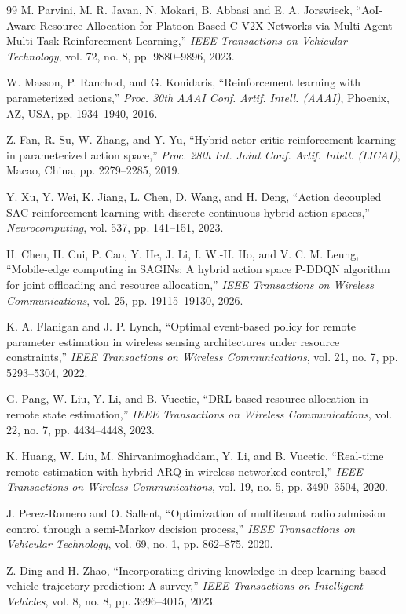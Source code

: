\documentclass[journal]{IEEEtran}
\begin{document}
\begin{thebibliography}{99}
 M. Parvini, M. R. Javan, N. Mokari, B. Abbasi and E. A. Jorswieck, ``AoI-Aware Resource Allocation for Platoon-Based C-V2X Networks via Multi-Agent Multi-Task Reinforcement Learning,'' \emph{IEEE Transactions on Vehicular Technology}, vol. 72, no. 8, pp. 9880--9896, 2023.

 W. Masson, P. Ranchod, and G. Konidaris, ``Reinforcement learning with parameterized actions,'' \emph{Proc. 30th AAAI Conf. Artif. Intell. (AAAI)}, Phoenix, AZ, USA, pp. 1934--1940, 2016.

 Z. Fan, R. Su, W. Zhang, and Y. Yu, ``Hybrid actor-critic reinforcement learning in parameterized action space,'' \emph{Proc. 28th Int. Joint Conf. Artif. Intell. (IJCAI)}, Macao, China, pp. 2279--2285, 2019.

 Y. Xu, Y. Wei, K. Jiang, L. Chen, D. Wang, and H. Deng, ``Action decoupled SAC reinforcement learning with discrete-continuous hybrid action spaces,'' \emph{Neurocomputing}, vol. 537, pp. 141--151, 2023.

 H. Chen, H. Cui, P. Cao, Y. He, J. Li, I. W.-H. Ho, and V. C. M. Leung, ``Mobile-edge computing in SAGINs: A hybrid action space P-DDQN algorithm for joint offloading and resource allocation,'' \emph{IEEE Transactions on Wireless Communications}, vol. 25, pp. 19115--19130, 2026.

 K. A. Flanigan and J. P. Lynch, ``Optimal event-based policy for remote parameter estimation in wireless sensing architectures under resource constraints,'' \emph{IEEE Transactions on Wireless Communications}, vol. 21, no. 7, pp. 5293--5304, 2022.

 G. Pang, W. Liu, Y. Li, and B. Vucetic, ``DRL-based resource allocation in remote state estimation,'' \emph{IEEE Transactions on Wireless Communications}, vol. 22, no. 7, pp. 4434--4448, 2023.

 K. Huang, W. Liu, M. Shirvanimoghaddam, Y. Li, and B. Vucetic, ``Real-time remote estimation with hybrid ARQ in wireless networked control,'' \emph{IEEE Transactions on Wireless Communications}, vol. 19, no. 5, pp. 3490--3504, 2020.

 J. Perez-Romero and O. Sallent, ``Optimization of multitenant radio admission control through a semi-Markov decision process,'' \emph{IEEE Transactions on Vehicular Technology}, vol. 69, no. 1, pp. 862--875, 2020.

 Z. Ding and H. Zhao, ``Incorporating driving knowledge in deep learning based vehicle trajectory prediction: A survey,'' \emph{IEEE Transactions on Intelligent Vehicles}, vol. 8, no. 8, pp. 3996--4015, 2023.


\end{thebibliography}
\end{document}
